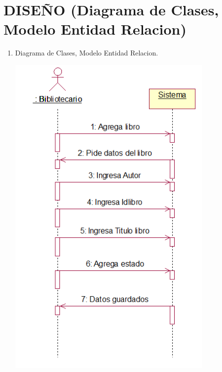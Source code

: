 \section{ DISEÑO (Diagrama de Clases, Modelo Entidad Relacion)} 

\begin{enumerate}[1.]
	\item Diagrama de Clases, Modelo Entidad Relacion.
    


	
	\begin{center}
	\includegraphics[width=10cm]{./Imagenes/img4} 
	\end{center}
	

\end{enumerate}
